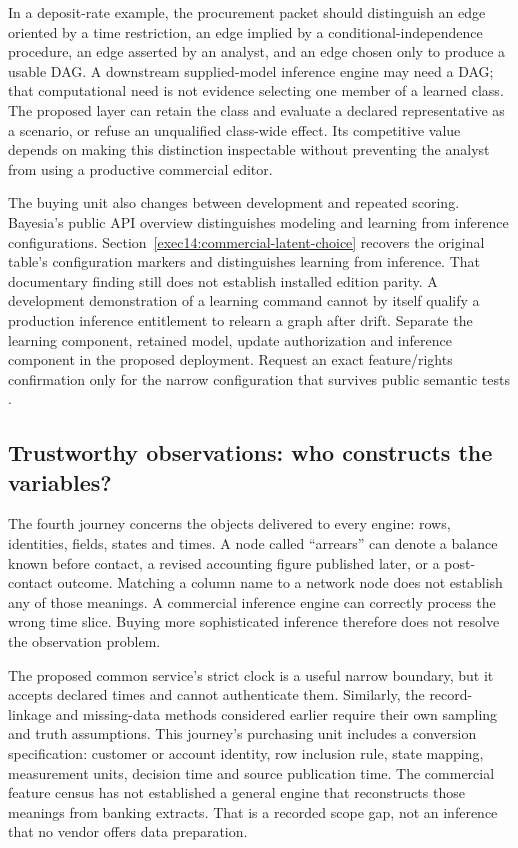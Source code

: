 In a deposit-rate example, the procurement packet should distinguish an edge
oriented by a time restriction, an edge implied by a conditional-independence
procedure, an edge asserted by an analyst, and an edge chosen only to produce
a usable DAG. A downstream supplied-model inference engine may need a DAG;
that computational need is not evidence selecting one member of a learned
class. The proposed layer can retain the class and evaluate a declared
representative as a scenario, or refuse an unqualified class-wide effect. Its
competitive value depends on making this distinction inspectable without
preventing the analyst from using a productive commercial editor.

The buying unit also changes between development and repeated scoring.
Bayesia's public API overview distinguishes modeling and learning from
inference configurations. Section~\ref{exec14:commercial-latent-choice} recovers the original table's
configuration markers and distinguishes learning from inference. That
documentary finding still does not establish installed edition parity. A development demonstration of a
learning command cannot by itself qualify a production inference entitlement
to relearn a graph after drift. Separate the learning component, retained
model, update authorization and inference component in the proposed deployment.
Request an exact feature/rights confirmation only for the narrow configuration
that survives public semantic tests \citep{exec13_bayesia_api}.

\subsection{Trustworthy observations: who constructs the variables?}

The fourth journey concerns the objects delivered to every engine: rows,
identities, fields, states and times. A node called ``arrears'' can denote a
balance known before contact, a revised accounting figure published later, or
a post-contact outcome. Matching a column name to a network node does not
establish any of those meanings. A commercial inference engine can correctly
process the wrong time slice. Buying more sophisticated inference therefore
does not resolve the observation problem.

The proposed common service's strict clock is a useful narrow boundary, but
it accepts declared times and cannot authenticate them. Similarly, the record-linkage and missing-data methods considered earlier require their own
sampling and truth assumptions. This journey's purchasing unit includes a
conversion specification: customer or account identity, row inclusion rule,
state mapping, measurement units, decision time and source publication time.
The commercial feature census has not established a general engine that
reconstructs those meanings from banking extracts. That is a recorded scope
gap, not an inference that no vendor offers data preparation.

